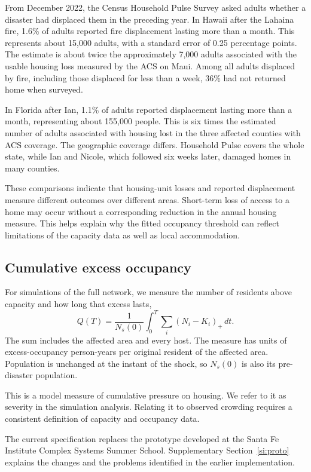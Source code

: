 \documentclass[11pt]{article}
\begin{document}
From December 2022, the Census Household Pulse Survey asked adults whether a disaster had displaced them in the preceding year. In Hawaii after the Lahaina fire, 1.6\% of adults reported fire displacement lasting more than a month. This represents about 15{,}000 adults, with a standard error of 0.25 percentage points. The estimate is about twice the approximately 7{,}000 adults associated with the usable housing loss measured by the ACS on Maui. Among all adults displaced by fire, including those displaced for less than a week, 36\% had not returned home when surveyed.

In Florida after Ian, 1.1\% of adults reported displacement lasting more than a month, representing about 155{,}000 people. This is six times the estimated number of adults associated with housing lost in the three affected counties with ACS coverage. The geographic coverage differs. Household Pulse covers the whole state, while Ian and Nicole, which followed six weeks later, damaged homes in many counties.

These comparisons indicate that housing-unit losses and reported displacement measure different outcomes over different areas. Short-term loss of access to a home may occur without a corresponding reduction in the annual housing measure. This helps explain why the fitted occupancy threshold can reflect limitations of the capacity data as well as local accommodation.

\subsection{Cumulative excess occupancy}\label{si:sim_measure}
For simulations of the full network, we measure the number of residents above capacity and how long that excess lasts,
\begin{equation}
Q(T)=\frac{1}{N_s(0)}\int_0^T\sum_i(N_i-K_i)_+\,dt.
\label{eq:severity}
\end{equation}
The sum includes the affected area and every host. The measure has units of excess-occupancy person-years per original resident of the affected area. Population is unchanged at the instant of the shock, so $N_s(0)$ is also its pre-disaster population.

This is a model measure of cumulative pressure on housing. We refer to it as severity in the simulation analysis. Relating it to observed crowding requires a consistent definition of capacity and occupancy data.

The current specification replaces the prototype developed at the Santa Fe Institute Complex Systems Summer School. Supplementary Section~\ref{si:proto} explains the changes and the problems identified in the earlier implementation.
\end{document}
